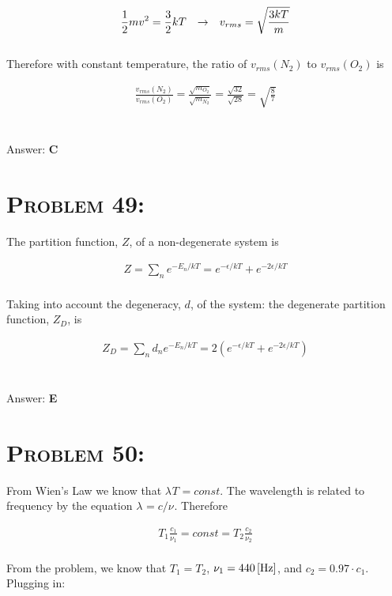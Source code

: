 \documentclass{article}
\begin{document}
\begin{gather}
\frac{1}{2}mv^{2} = \frac{3}{2} k T \hspace{.1in} \rightarrow \hspace{.1in} v_{rms} = \sqrt{\frac{3kT}{m}}
\end{gather}
\\
Therefore with constant temperature, the ratio of $v_{rms}(N_{2})$ to $v_{rms}(O_{2})$ is

\begin{gather}
\frac{v_{rms}(N_{2})}{v_{rms}(O_{2})} = \frac{\sqrt{m_{O_{2}}}}{\sqrt{m_{N_{2}}}} = \frac{\sqrt{32}}{\sqrt{28}} = \boxed{\sqrt{\frac{8}{7}}}\nonumber
\end{gather}
\\\\
Answer: \textbf{\textcolor{ProcessBlue}C}\\


\section{\textsc{Problem 49:}} The partition function, $Z$, of a non-degenerate system is

\begin{gather}
Z = \sum_{n}{e^{-E_{n}/kT}} = e^{-\epsilon/kT} + e^{-2 \epsilon/kT}
\end{gather}
\\
Taking into account the degeneracy, $d$, of the system: the degenerate partition function, $Z_{D}$, is

\begin{gather}
Z_{D} = \sum_{n}{d_{n} e^{-E_{n}/kT}} =2 \left( e^{-\epsilon/kT} + e^{-2 \epsilon/kT}  \right)
\end{gather}
\\\\
Answer: \textbf{\textcolor{ProcessBlue}E}\\


\section{\textsc{Problem 50:}} From Wien's Law we know that $\lambda_{} T_{}  = const$. The wavelength is related to frequency by the equation  $\lambda_{} = c/\nu_{}$. Therefore

\begin{gather}
T_{1}  \frac{c_{1}}{\nu_{1}} = const = T_{2}  \frac{c_{2}}{\nu_{2}}\nonumber
\end{gather}
\\
From the problem, we know that $T_{1} = T_{2}$, $\nu_{1} = \unit[440]{[Hz]}$, and $c_{2}  = 0.97 \cdot c_{1}$. Plugging in:
\end{document}
